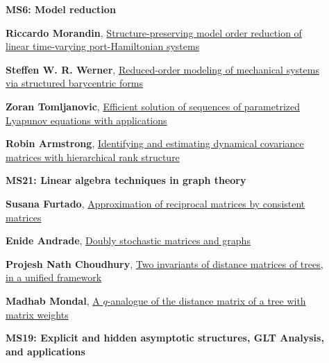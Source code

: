 \documentclass[ILAS2025-program.tex]{subfiles}
\begin{document}
\begin{description}
\begin{description}
        \end{description}
    \begin{description}
    \item[] {\color{mstitle}\textbf{MS6: Model reduction}} 
    \item[] \hypertarget{up0165}{}\textbf{Riccardo Morandin}, \hyperlink{down0165}{Structure-preserving model order reduction of linear time-varying port-Hamiltonian systems}
        \item[] \hypertarget{up0166}{}\textbf{Steffen W. R. Werner}, \hyperlink{down0166}{Reduced-order modeling of mechanical systems via structured barycentric forms}
        \item[] \hypertarget{up0167}{}\textbf{Zoran Tomljanovic}, \hyperlink{down0167}{Efficient solution of sequences of parametrized Lyapunov equations with applications}
        \item[] \hypertarget{up0168}{}\textbf{Robin Armstrong}, \hyperlink{down0168}{Identifying and estimating dynamical covariance matrices with hierarchical rank structure}
        \end{description}
    \begin{description}
    \item[] {\color{mstitle}\textbf{MS21: Linear algebra techniques in graph theory}} 
    \item[] \hypertarget{up0169}{}\textbf{Susana Furtado}, \hyperlink{down0169}{Approximation of reciprocal matrices by consistent matrices}
        \item[] \hypertarget{up0170}{}\textbf{Enide Andrade}, \hyperlink{down0170}{Doubly stochastic matrices and graphs}
        \item[] \hypertarget{up0171}{}\textbf{Projesh Nath Choudhury}, \hyperlink{down0171}{Two invariants of distance matrices of trees, in a unified framework}
        \item[] \hypertarget{up0172}{}\textbf{Madhab Mondal}, \hyperlink{down0172}{A $q$-analogue of the distance matrix of a tree with matrix weights}
        \end{description}
    \begin{description}
    \item[] {\color{mstitle}\textbf{MS19: Explicit and hidden asymptotic structures, GLT Analysis, and applications}} 

\end{description}
\end{description}
\end{document}
